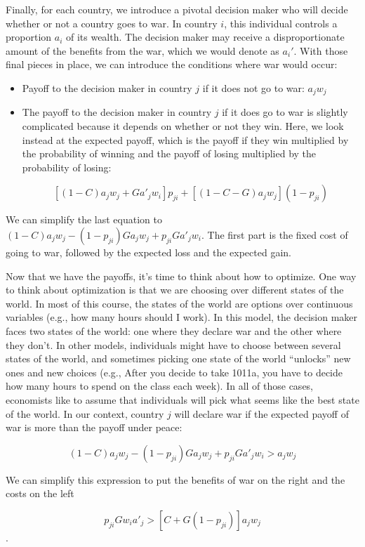 Finally, for each country, we introduce a pivotal decision maker who will decide whether or not a country goes to war. In country $i$, this individual controls a proportion $a_i$ of its wealth. The decision maker may receive a disproportionate amount of the benefits from the war, which we would denote as $a_i'$. With those final pieces in place, we can introduce the conditions where war would occur:
\begin{itemize}
    \item Payoff to the decision maker in country $j$ if it does not go to war: $a_j w_j$
    \item The payoff to the decision maker in country $j$ if it does go to war is slightly complicated because it depends on whether or not they win. Here, we look instead at the expected payoff, which is the payoff if they win multiplied by the probability of winning and the payoff of losing multiplied by the probability of losing: 
    
    $$[(1 - C)a_j w_j + Ga'_jw_i]p_{ji} + [(1 - C - G)a_jw_j](1-p_{ji})$$
\end{itemize}
We can simplify the last equation to $(1-C)a_jw_j - (1-p_{ji})Ga_jw_j + p_{ji}Ga'_jw_i$. The first part is the fixed cost of going to war, followed by the expected loss and the expected gain. 

Now that we have the payoffs, it's time to think about how to optimize. One way to think about optimization is that we are choosing over different states of the world. In most of this course, the states of the world are options over continuous variables (e.g., how many hours should I work). In this model, the decision maker faces two states of the world: one where they declare war and the other where they don't. In other models, individuals might have to choose between several states of the world, and sometimes picking one state of the world ``unlocks'' new ones and new choices (e.g., After you decide to take 1011a, you have to decide how many hours to spend on the class each week). In all of those cases, economists like to assume that individuals will pick what seems like the best state of the world. In our context, country $j$ will declare war if the expected payoff of war is more than the payoff under peace:

$$(1-C)a_jw_j - (1-p_{ji})Ga_jw_j + p_{ji}Ga'_jw_i > a_jw_j$$

We can simplify this expression to put the benefits of war on the right and the costs on the left

$$p_{ji}Gw_ia'_j > [C + G(1-p_{ji})]a_jw_j$$.


